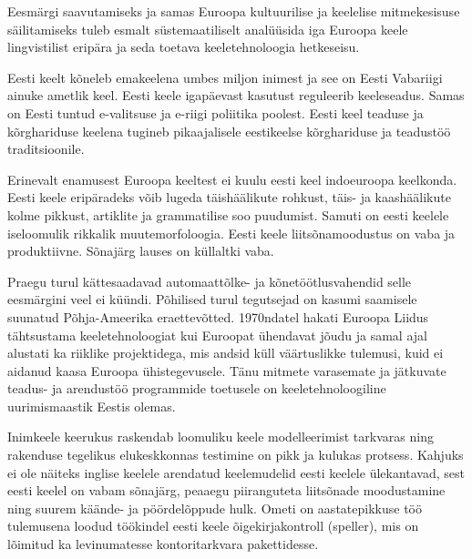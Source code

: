 \begin{multicols}{2}
Eesmärgi saavutamiseks ja samas Euroopa kultuurilise ja keelelise mitmekesisuse säilitamiseks tuleb esmalt süstemaatiliselt analüüsida iga Euroopa keele lingvistilist eripära ja seda toetava keeletehnoloogia hetkeseisu. 

Eesti keelt kõneleb emakeelena umbes miljon inimest ja see on Eesti Vabariigi ainuke ametlik keel. Eesti keele igapäevast kasutust reguleerib keeleseadus. Samas on Eesti tuntud e-valitsuse ja e-riigi poliitika poolest.
Eesti keel teaduse ja kõrghariduse keelena tugineb pikaajalisele eestikeelse kõrghariduse ja teadustöö traditsioonile.

Erinevalt enamusest Euroopa keeltest ei kuulu eesti keel indoeuroopa keelkonda. 
Eesti keele eripäradeks võib lugeda täishäälikute rohkust, täis- ja kaashäälikute kolme pikkust, artiklite ja grammatilise soo puudumist. 
Samuti on eesti keelele iseloomulik rikkalik muutemorfoloogia. 
Eesti keele liitsõnamoodustus on vaba ja produktiivne. Sõnajärg lauses on küllaltki vaba.



Praegu turul kättesaadavad automaattõlke- ja kõnetöötlusvahendid selle eesmärgini veel ei küündi. 
Põhilised turul tegutsejad on kasumi saamisele suunatud Põhja-Ameerika eraettevõtted. 
1970ndatel hakati Euroopa Liidus tähtsustama keeletehnoloogiat kui Euroopat ühendavat jõudu ja samal ajal alustati ka riiklike projektidega, mis andsid küll väärtuslikke tulemusi, kuid ei aidanud kaasa Euroopa ühistegevusele. 
Tänu mitmete varasemate ja jätkuvate teadus- ja arendustöö programmide toetusele on keeletehnoloogiline uurimismaastik Eestis olemas.

Inimkeele keerukus raskendab loomuliku keele modelleerimist tarkvaras ning raken\-duse tegelikus elukeskkonnas testimine on pikk ja kulukas protsess. 
Kahjuks ei ole näiteks inglise keelele arendatud keelemudelid eesti keelele ülekantavad, sest eesti keelel on vabam sõnajärg, peaaegu piiranguteta liitsõnade moodustamine ning suurem käände- ja pöördelõppude hulk. 
Ometi on aastatepikkuse töö tulemusena loodud töökindel eesti keele õigekirjakontroll (speller), mis on lõimitud ka levinumatesse kontoritarkvara pakettidesse.


\end{multicols}
